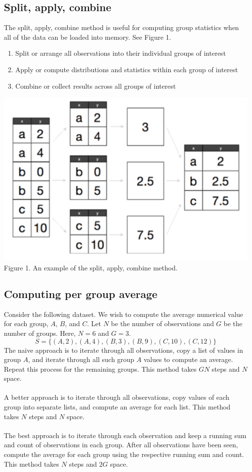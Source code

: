 \subsection{Split, apply, combine}
The split, apply, combine method is useful for computing group statistics when all of the data can be loaded into memory. See Figure 1.
\begin{enumerate}
    \item Split or arrange all observations into their individual groups of interest
    \item Apply or compute distributions and statistics within each group of interest
    \item Combine or collect results across all groups of interest
\end{enumerate}
\begin{center}
\includegraphics[width=0.4\linewidth]{figures/sac.png}\\
Figure 1. An example of the split, apply, combine method.
\end{center}

\subsection{Computing per group average}
Consider the following dataset. We wish to compute the average numerical value for each group, $A$, $B$, and $C$. Let $N$ be the number of observations and $G$ be the number of groups. Here, $N = 6$ and $G = 3$.
$$S = \{(A, 2), (A, 4), (B, 3), (B, 9), (C, 10), (C, 12)\}$$
The naive approach is to iterate through all observations, copy a list of values in group $A$, and iterate through all such group $A$ values to compute an average. Repeat this process for the remaining groups. This method takes $GN$ steps and $N$ space.\\\\
A better approach is to iterate through all observations, copy values of each group into separate lists, and compute an average for each list. This method takes $N$ steps and $N$ space.\\\\
The best approach is to iterate through each observation and keep a running sum and count of observations in each group. After all observations have been seen, compute the average for each group using the respective running sum and count. This method takes $N$ steps and $2G$ space.


